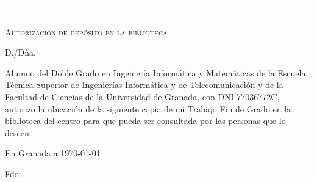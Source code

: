 
\thispagestyle{empty}
{}

\hfill
\vfill
\noindent\rule[-1ex]{\textwidth}{2pt}\\[4.5ex]
\textsc{Autorización de depósito en la biblioteca}\\\bigskip

D./Dña. \miNombre \\\medskip

Alumno del Doble Grado en Ingeniería Informática y Matemáticas de la Escuela Técnica Superior de Ingenierías Informática y de Telecomunicación y de la Facultad de Ciencias de la Universidad de Granada, con DNI 77036772C, autorizo la ubicación de la siguiente copia de mi Trabajo Fin de Grado en la biblioteca del centro para que pueda ser consultada por las personas que lo deseen.
\medskip

En Granada a \today 
\vspace{3cm}
\begin{center} 
Fdo: \miNombre 

\end{center}

\vfill

\cleardoublepage
\endinput